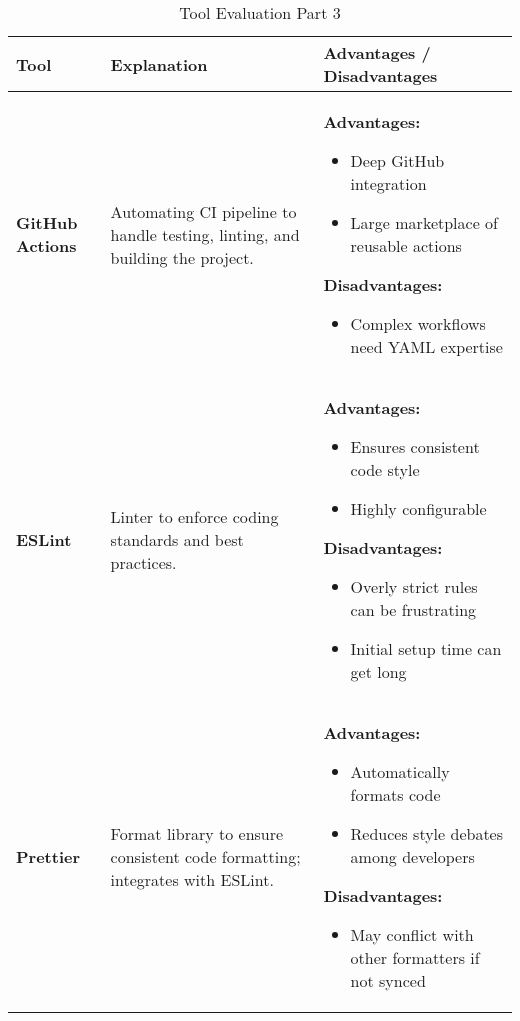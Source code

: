 \documentclass{article}
\begin{document}
\begin{table}[htbp]
  \caption{Tool Evaluation Part 3}
  \label{TblToolEval}
  \renewcommand{\arraystretch}{1.2}   %
  \setlength{\tabcolsep}{5pt}         %
  \begin{tabularx}{\textwidth}{p{2cm} p{4cm} X}
  \toprule
  \textbf{Tool} & \textbf{Explanation} & \textbf{Advantages / Disadvantages}\\

  \midrule 

  \textbf{GitHub Actions} 
  & Automating CI pipeline to handle testing, linting, and building the project.
  & \textbf{Advantages:}
    \begin{itemize}
      \item Deep GitHub integration
      \item Large marketplace of reusable actions
    \end{itemize}
    \textbf{Disadvantages:}
    \begin{itemize}
      \item Complex workflows need YAML expertise
    \end{itemize}
  \\
  \midrule

  \textbf{ESLint} 
  & Linter to enforce coding standards and best practices.
  & \textbf{Advantages:}
    \begin{itemize}
      \item Ensures consistent code style
      \item Highly configurable
    \end{itemize}
    \textbf{Disadvantages:}
    \begin{itemize}
      \item Overly strict rules can be frustrating
      \item Initial setup time can get long 
    \end{itemize}
  \\
  \midrule

  \textbf{Prettier} 
  & Format library to ensure consistent code formatting; integrates with ESLint.
  & \textbf{Advantages:}
    \begin{itemize}
      \item Automatically formats code
      \item Reduces style debates among developers
    \end{itemize}
    \textbf{Disadvantages:}
    \begin{itemize}
      \item May conflict with other formatters if not synced
    \end{itemize}
  \\
  \midrule


\end{tabularx}
\end{table}
\end{document}
